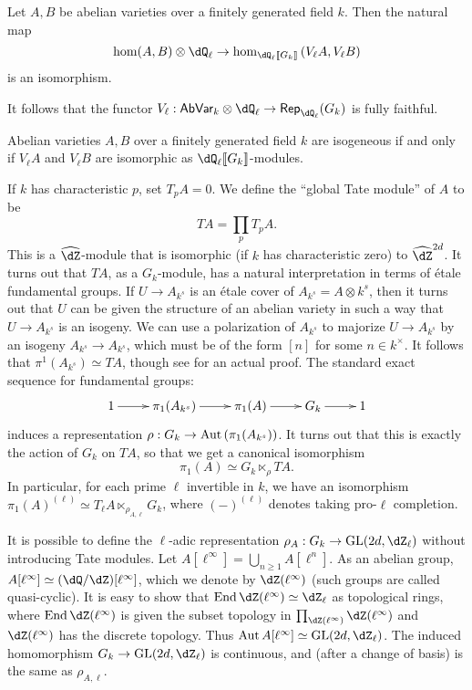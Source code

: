 \documentclass{article}
\begin{document}
\begin{theorem}[Faltings]
Let $A,B$ be abelian varieties over a finitely generated field $k$. Then 
the natural map 
\[
  \hom(A,B)\otimes\dQ_\ell \to \hom_{\dQ_\ell\llbracket G_k\rrbracket}\left(V_\ell A,V_\ell B\right)
\]
is an isomorphism. 
\end{theorem}

It follows that the functor 
$V_\ell:\mathsf{AbVar}_k\otimes\dQ_\ell\to \mathsf{Rep}_{\dQ_\ell}(G_k)$ is 
fully faithful. 

\begin{corollary}
Abelian varieties $A,B$ over a finitely generated field $k$ are isogeneous if 
and only if $V_\ell A$ and $V_\ell B$ are isomorphic as 
$\dQ_\ell\llbracket G_k\rrbracket$-modules.
\end{corollary}

If $k$ has characteristic $p$, set $T_p A=0$. We define the ``global Tate 
module'' of $A$ to be 
\[
  T A = \prod_p T_p A \text{.}
\]
This is a $\widehat\dZ$-module that is isomorphic (if $k$ has characteristic 
zero) to $\widehat\dZ^{2d}$. It turns out that $T A$, as a $G_k$-module, has a 
natural interpretation in terms of \'etale fundamental groups. If 
$U\to A_{k^s}$ is an \'etale cover of $A_{k^s}=A\otimes k^s$, then it turns out 
that $U$ can be given the structure of an abelian variety in such a way that 
$U\to A_{k^s}$ is an isogeny. We can use a polarization of $A_{k^s}$ to 
majorize $U\to A_{k^s}$ by an isogeny $A_{k^s}\to A_{k^s}$, which must be of 
the form $[n]$ for some $n\in k^\times$. It follows that 
$\pi^1(A_{k^s}) \simeq T A$, though see \cite[10.37]{gm13} for an actual 
proof. The standard exact sequence for fundamental groups:
\[\xymatrix{
  1 \ar[r] 
    & \pi_1(A_{k^s}) \ar[r] 
    & \pi_1(A) \ar[r] 
    & G_k \ar[r] 
    & 1
}\]
induces a representation 
$\rho:G_k\to \operatorname{Aut}\left(\pi_1(A_{k^s})\right)$. It turns out that 
this is exactly the action of $G_k$ on $T A$, so that we get a canonical 
isomorphism 
\[
  \pi_1(A) \simeq G_k \ltimes_\rho T A \text{.}
\]
In particular, for each prime $\ell$ invertible in $k$, we have an isomorphism 
$\pi_1(A)^{(\ell)} \simeq T_\ell A\ltimes_{\rho_{A,\ell}} G_k$, where 
$(-)^{(\ell)}$ denotes taking pro-$\ell$ completion. 

It is possible to define the $\ell$-adic representation 
$\rho_A:G_k\to \operatorname{GL}(2d,\dZ_\ell)$ without introducing Tate 
modules. Let $A[\ell^\infty] = \bigcup_{n\geqslant 1} A[\ell^n]$. As an 
abelian group, $A[\ell^\infty]\simeq (\dQ/\dZ)[\ell^\infty]$, which we denote 
by $\dZ(\ell^\infty)$ (such groups are called quasi-cyclic). It is easy to 
show that $\End \dZ(\ell^\infty)\simeq \dZ_\ell$ as topological 
rings, where $\End \dZ(\ell^\infty)$ is given the subset topology in 
$\prod_{\dZ(\ell^\infty)} \dZ(\ell^\infty)$ and $\dZ(\ell^\infty)$ has the 
discrete topology. Thus 
$\aut A[\ell^\infty]\simeq \operatorname{GL}(2 d,\dZ_\ell)$. The induced 
homomorphism $G_k \to \operatorname{GL}(2 d,\dZ_\ell)$ is continuous, and 
(after a change of basis) is the same as $\rho_{A,\ell}$. 
\end{document}
